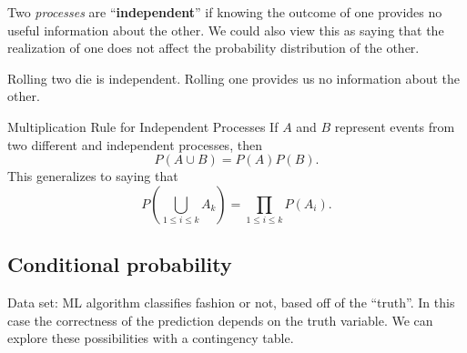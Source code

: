 \begin{definition}[]
    Two \emph{processes}  are ``\textbf{independent}'' if knowing the outcome of one provides no useful information about the other. We could also view this as saying that the realization of one does not affect the probability distribution of the other.
\end{definition}
\begin{example}
    Rolling two die is independent. Rolling one provides us no information about the other.
\end{example}
\begin{namedthing}{Multiplication Rule for Independent Processes} 
   If $A$ and $B$ represent events from two different and independent processes, then \[
       P(A \cup B)=P(A)P(B).
   \] This generalizes to saying that \[
   P\left( \bigcup_{1 \leq i \leq k}A_k  \right) = \prod _{1\leq i \leq k} P(A_i ).
   \] 
\end{namedthing}

\subsection{Conditional probability}
Data set: ML algorithm classifies fashion or not, based off of the ``truth''. In this case the correctness of the prediction depends on the truth variable. We can explore these possibilities with a contingency table.

